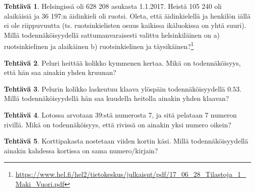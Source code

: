 \documentclass[12pt,leqno,a4paper,oneside]{amsart}
\theoremstyle{definition}
\newtheorem{exercise}{Tehtävä}
\theoremstyle{remark}
\numberwithin{equation}{section}
\begin{document}





\begin{exercise}
Helsingissä oli 628 208 asukasta 1.1.2017. Heistä 105 240 oli alaikäisiä ja 36 197:n äidinkieli oli ruotsi. Oleta, että äidinkielellä
ja henkilön iällä ei ole riippuvuutta (ts. ruotsinkielisten osuus kaikissa ikäluokissa on yhtä suuri). 
Millä todennäköisyydellä sattumanvaraisesti valittu helsinkiläinen on a) ruotsinkielinen ja alaikäinen
b) ruotsinkielinen ja täysikäinen?\footnote{\url{https://www.hel.fi/hel2/tietokeskus/julkaisut/pdf/17_06_28_Tilastoja_1_Maki_Vuori.pdf}} 
\end{exercise}

\begin{exercise}
 Peluri heittää kolikko kymmenen kertaa. Mikä on toden\-näköisyys, että hän saa ainakin yhden kruunan?
\end{exercise}

\begin{exercise}
 Pelurin kolikko laskeutuu klaava ylöspäin todennäköisyydellä $0.53$. Millä toden\-näköisyydellä hän saa kuudella heitolla ainakin yhden klaavan?
\end{exercise}


\begin{exercise}
 Lotossa arvotaan 39:stä numerosta 7, ja sitä pelataan 7 numeron rivillä. Mikä on todennäköisyys, että rivissä on ainakin yksi numero oikein?
\end{exercise}

\begin{exercise}
 Korttipakasta nostetaan viiden kortin käsi. Millä toden\-näköisyydellä ainakin kahdessa kortissa on sama numero/kirjain?
\end{exercise}
\end{document}
